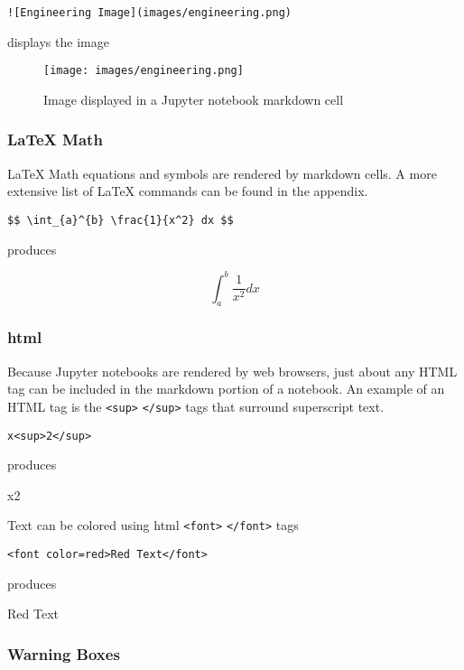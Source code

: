 \documentclass{book}
\makeatletter
\def\maxwidth{\ifdim\Gin@nat@width>\linewidth\linewidth
\else\Gin@nat@width\fi}
\let\Oldincludegraphics\includegraphics
\renewcommand{\includegraphics}[1]{\Oldincludegraphics[width=.8\maxwidth]{#1}}
\newcommand{\passthrough}[1]{#1}
\makeatother
\begin{document}
\begin{lstlisting}
![Engineering Image](images/engineering.png)
\end{lstlisting}

displays the image

\begin{figure}
\centering
\texttt{[image: images/engineering.png]}
\caption{Image displayed in a Jupyter notebook markdown cell}
\end{figure}

\hypertarget{latex-math}{%
\subsubsection{LaTeX Math}\label{latex-math}}

LaTeX Math equations and symbols are rendered by markdown cells. A more
extensive list of LaTeX commands can be found in the appendix.

\begin{lstlisting}
$$ \int_{a}^{b} \frac{1}{x^2} dx $$
\end{lstlisting}

produces

\[ \int_{a}^{b} \frac{1}{x^2} dx \]

\hypertarget{html}{%
\subsubsection{html}\label{html}}

Because Jupyter notebooks are rendered by web browsers, just about any
HTML tag can be included in the markdown portion of a notebook. An
example of an HTML tag is the \passthrough{\lstinline!<sup>!}
\passthrough{\lstinline!</sup>!} tags that surround superscript text.

\begin{lstlisting}
x<sup>2</sup>
\end{lstlisting}

produces

x2

Text can be colored using html \passthrough{\lstinline!<font>!}
\passthrough{\lstinline!</font>!} tags

\begin{lstlisting}
<font color=red>Red Text</font>
\end{lstlisting}

produces

Red Text

\hypertarget{warning-boxes}{%
\subsubsection{Warning Boxes}\label{warning-boxes}}
\end{document}
